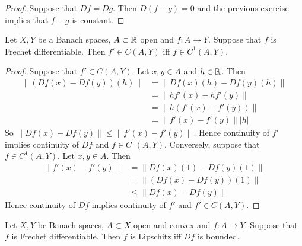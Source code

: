 \documentclass{book}
\begin{document}
	\begin{proof}
		Suppose that $Df = Dg$. Then $D(f-g) = 0$ and the previous exercise implies that $f -g$ is constant.
	\end{proof}		
	
	\begin{ex} 
	Let $X, Y$ be a Banach spaces, $A \subset \mathbb{R}$ open and $f:A \rightarrow Y$. Suppose that $f$ is Frechet differentiable. Then $f' \in C(A,Y)$ iff $f \in C^1(A,Y)$.
	\end{ex}
	
	\begin{proof}
	Suppose that $f' \in C(A, Y)$. Let $x,y \in A$ and $h \in \mathbb{R}$. Then 
	\begin{align*}
	\|(Df(x)- Df(y))(h)\| 
	&= \|Df(x)(h) - Df(y)(h)\| \\
	&=  \|hf'(x) - hf'(y)\| \\
	&= \|h(f'(x) - f'(y))\| \\
	&= \|f'(x) - f'(y)\||h|
	\end{align*}
	So $\|Df(x) - Df(y)\| \leq \|f'(x) - f'(y)\|$. Hence continuity of $f'$ implies continuity of $Df$ and $f \in C^1(A, Y)$.
	Conversely, suppose that $f \in C^1(A, Y)$. Let $x,y \in A$. Then 
	\begin{align*}
	\|f'(x) - f'(y)\| 
	&= \|Df(x)(1) - Df(y)(1)\| \\
	&= \|(Df(x) - Df(y))(1)\| \\
	& \leq \| Df(x) - Df(y)\|
	\end{align*}
	Hence continuity of $Df$ implies continuity of $f'$ and $f' \in C(A, Y)$.
	\end{proof}

	\begin{ex}
		Let $X,Y$ be Banach spaces, $A \subset X$ open and convex and $f:A \rightarrow Y$. Suppose that $f$ is Frechet differentiable. Then $f$ is Lipschitz iff $Df$ is bounded.
	\end{ex}
\end{document}

